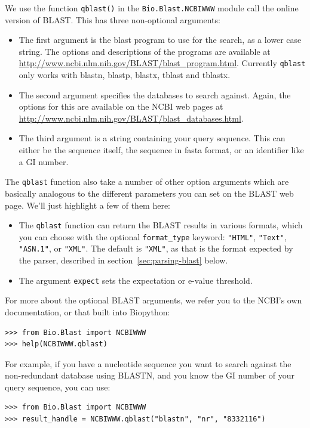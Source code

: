 \documentclass{report}
\begin{document}
We use the function \verb|qblast()| in the \verb|Bio.Blast.NCBIWWW| module
call the online version of BLAST.  This has three non-optional arguments:
\begin{itemize}
\item The first argument is the blast program to use for the search, as a
lower case string. The options and descriptions of the programs are
available at \url{http://www.ncbi.nlm.nih.gov/BLAST/blast_program.html}.
Currently \verb|qblast| only works with blastn, blastp, blastx, tblast
and tblastx.
\item The second argument specifies the databases to search against. Again,
the options for this are available on the NCBI web pages at
\url{http://www.ncbi.nlm.nih.gov/BLAST/blast_databases.html}.
\item The third argument is a string containing your query sequence.  This
can either be the sequence itself, the sequence in fasta format,
or an identifier like a GI number.
\end{itemize}

The \verb|qblast| function also take a number of other option arguments
which are basically analogous to the different parameters you can set
on the BLAST web page.  We'll just highlight a few of them here:

\begin{itemize}
\item The \verb|qblast| function can return the BLAST results in various
formats, which you can choose with the optional \verb|format_type| keyword:
\verb|"HTML"|, \verb|"Text"|, \verb|"ASN.1"|, or \verb|"XML"|.
The default is \verb|"XML"|, as that is the format expected by the parser,
described in section~\ref{sec:parsing-blast} below.
\item The argument \verb|expect| sets the expectation or e-value threshold.
\end{itemize}

For more about the optional BLAST arguments, we refer you to the NCBI's own
documentation, or that built into Biopython:

\begin{verbatim}
>>> from Bio.Blast import NCBIWWW
>>> help(NCBIWWW.qblast)
\end{verbatim}

For example, if you have a nucleotide sequence you want to search against
the non-redundant database using BLASTN, and you know the GI number of your
query sequence, you can use:

\begin{verbatim}
>>> from Bio.Blast import NCBIWWW
>>> result_handle = NCBIWWW.qblast("blastn", "nr", "8332116")
\end{verbatim}
\end{document}

